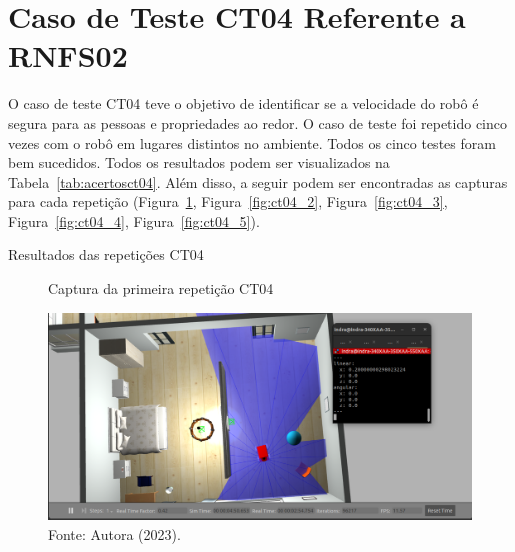 \section{Caso de Teste CT04 Referente a RNFS02}
O caso de teste CT04 teve o objetivo de identificar se a velocidade do robô é segura para as pessoas e propriedades ao redor. O caso de teste foi repetido cinco vezes com o robô em lugares distintos no ambiente. Todos os cinco testes foram bem sucedidos. Todos os resultados podem ser visualizados na Tabela~\ref{tab:acertosct04}. Além disso, a seguir podem ser encontradas as capturas para cada repetição (Figura~\ref{fig:ct04_1}, Figura~\ref{fig:ct04_2}, Figura~\ref{fig:ct04_3}, Figura~\ref{fig:ct04_4}, Figura~\ref{fig:ct04_5}).


\begin{table}[H]
\centering
\caption{Resultados das repetições CT04}
\label{tab:acertosct04}
\caption*{Fonte: Autora (2023).}
\end{table}

\begin{figure}[H]
    \centering
    \caption{Captura da primeira repetição CT04}
    \includegraphics[scale=0.35]{ct04_1.png}
    \caption*{Fonte: Autora (2023).}
    \label{fig:ct04_1}
\end{figure}


